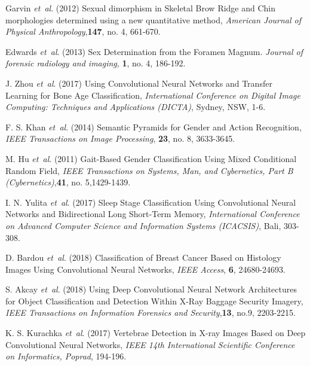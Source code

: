 \documentclass{bioinfo}
\begin{document}
\begin{thebibliography}{}
Garvin {\it et~al}. (2012) Sexual dimorphism in Skeletal Brow Ridge and Chin morphologies determined using a new quantitative method, {\it American Journal of Physical Anthropology},{\bf 147}, no. 4, 661-670.

Edwards {\it et~al}. (2013) Sex Determination from the Foramen Magnum. {\it Journal of forensic radiology and imaging}, {\bf 1}, no. 4, 186-192.

J. Zhou  {\it et~al}. (2017) Using Convolutional Neural Networks and Transfer Learning for Bone Age Classification, {\it International Conference on Digital Image Computing: Techniques and Applications (DICTA)}, Sydney, NSW,  1-6.

 F. S. Khan {\it et~al}. (2014) Semantic Pyramids for Gender and Action Recognition, {\it IEEE Transactions on Image Processing}, {\bf 23}, no. 8, 3633-3645.
 
M. Hu {\it et~al}. (2011) Gait-Based Gender Classification Using Mixed Conditional Random Field,  {\it IEEE Transactions on Systems, Man, and Cybernetics, Part B (Cybernetics)},{\bf 41}, no. 5,1429-1439.

I. N. Yulita {\it et~al}. (2017) Sleep Stage Classification Using Convolutional Neural Networks and Bidirectional Long Short-Term Memory, {\it International Conference on Advanced Computer Science and Information Systems (ICACSIS)}, Bali, 303-308.

D. Bardou {\it et~al}. (2018) Classification of Breast Cancer Based on Histology Images Using Convolutional Neural Networks, {\it IEEE Access}, {\bf 6}, 24680-24693.

S. Akcay {\it et~al}. (2018) Using Deep Convolutional Neural Network Architectures for Object Classification and Detection Within X-Ray Baggage Security Imagery, {\it IEEE Transactions on Information Forensics and Security},{\bf 13}, no.9, 2203-2215.

K. S. Kurachka {\it et~al}.  (2017) Vertebrae Detection in X-ray Images Based on Deep Convolutional Neural Networks, {\it IEEE 14th International Scientific Conference on Informatics, Poprad}, 194-196.


\end{thebibliography}
\end{document}
